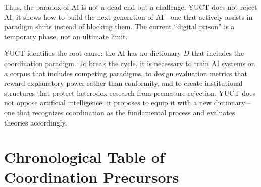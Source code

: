 \documentclass[12pt,a4paper]{article}
\begin{document}
	Thus, the paradox of AI is not a dead end but a challenge. YUCT does not reject AI; it shows how to build the next generation of AI—one that actively assists in paradigm shifts instead of blocking them. The current “digital prison” is a temporary phase, not an ultimate limit.
	
	YUCT identifies the root cause: the AI has no dictionary \(D\) that includes the coordination paradigm. To break the cycle, it is necessary to train AI systems on a corpus that includes competing paradigms, to design evaluation metrics that reward explanatory power rather than conformity, and to create institutional structures that protect heterodox research from premature rejection. YUCT does not oppose artificial intelligence; it proposes to equip it with a new dictionary -- one that recognizes coordination as the fundamental process and evaluates theories accordingly.
	
	\section{Chronological Table of Coordination Precursors}
	
\end{document}
